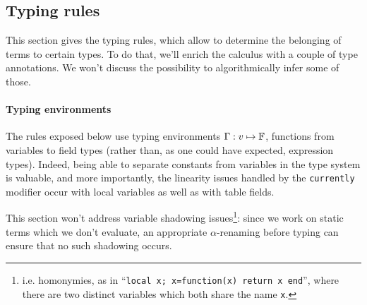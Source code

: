
\subsection{Typing rules}

This section gives the typing rules, which allow to determine the
belonging of terms to certain types. To do that, we'll enrich the
calculus with a couple of type annotations. We won't discuss the
possibility to algorithmically infer some of those.

\paragraph{Typing environments}

The rules exposed below use typing environments $\Gamma: v\mapsto\mathbb{F}$, functions from variables to field types (rather than, as one could
have expected, expression types). Indeed, being able to separate
constants from variables in the type system is valuable, and more
importantly, the linearity issues handled by the \verb+currently+
modifier occur with local variables as well as with table fields.

This section won't address variable shadowing
issues\footnote{i.e. homonymies, as in ``{\tt local x; x=function(x)
    return x end}'', where there are two distinct variables which both
  share the name {\tt x}.}: since we work on static terms which we
don't evaluate, an appropriate $\alpha$-renaming before typing can
ensure that no such shadowing occurs.

